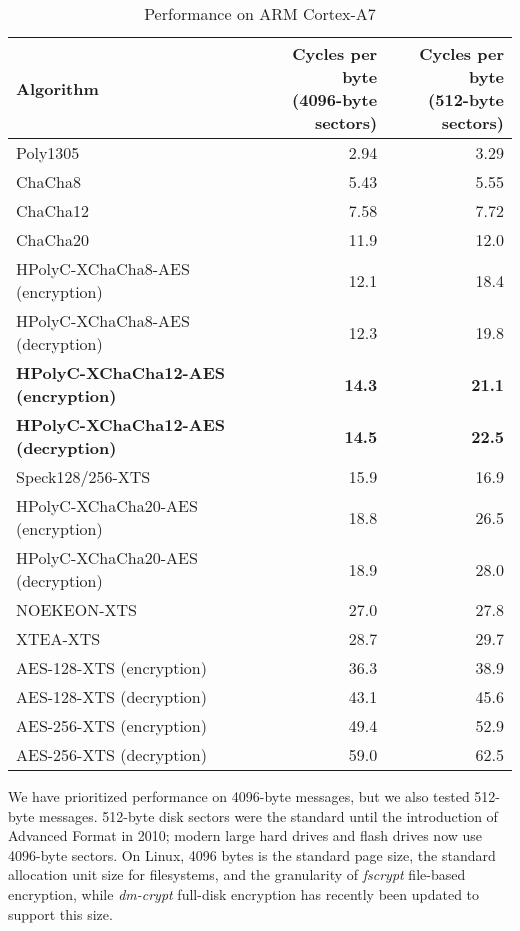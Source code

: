 \documentclass[letterpaper,luatex,11pt]{article}
\begin{document}
\begin{table}
    \caption{Performance on ARM Cortex-A7}
    \label{performance}
    \centering
    \begin{tabular}{lrr}
        Algorithm &
            \makecell{Cycles per byte \\ (4096-byte sectors)} &
            \makecell{Cycles per byte \\ (512-byte sectors)} \\
    \hline
    Poly1305                              & 2.94 & 3.29 \\
    ChaCha8                               & 5.43 & 5.55 \\
    ChaCha12                              & 7.58 & 7.72 \\
    ChaCha20                              & 11.9 & 12.0 \\
    HPolyC-XChaCha8-AES (encryption)      & 12.1 & 18.4 \\
    HPolyC-XChaCha8-AES (decryption)      & 12.3 & 19.8 \\
    \textbf{HPolyC-XChaCha12-AES (encryption)} & \textbf{14.3} & \textbf{21.1} \\
    \textbf{HPolyC-XChaCha12-AES (decryption)} & \textbf{14.5} & \textbf{22.5} \\
    Speck128/256-XTS                      & 15.9 & 16.9 \\
    HPolyC-XChaCha20-AES (encryption)     & 18.8 & 26.5 \\
    HPolyC-XChaCha20-AES (decryption)     & 18.9 & 28.0 \\
    NOEKEON-XTS                           & 27.0 & 27.8 \\
    XTEA-XTS                              & 28.7 & 29.7 \\
    AES-128-XTS (encryption)              & 36.3 & 38.9 \\
    AES-128-XTS (decryption)              & 43.1 & 45.6 \\
    AES-256-XTS (encryption)              & 49.4 & 52.9 \\
    AES-256-XTS (decryption)              & 59.0 & 62.5 \\
    \end{tabular}
\end{table}

We have prioritized performance on 4096-byte messages, but we also tested 512-byte messages.
512-byte disk sectors were the standard until the introduction of Advanced Format in 2010;
modern large hard drives and flash drives now use 4096-byte sectors.
On Linux, 4096 bytes is the standard page size, the standard allocation unit size for filesystems,
and the granularity of \textit{fscrypt} file-based encryption, while
\mbox{\textit{dm-crypt}} full-disk encryption has recently been updated
to support this size.
\end{document}
